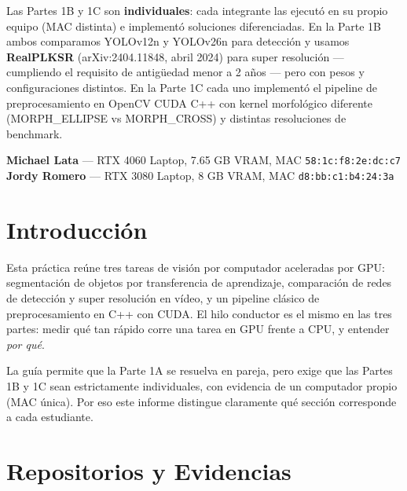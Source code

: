 \documentclass[12pt,a4paper]{article}
\begin{document}
Las Partes 1B y 1C son \textbf{individuales}: cada integrante las ejecutó en su propio equipo (MAC distinta) e implementó soluciones diferenciadas. En la Parte 1B ambos comparamos YOLOv12n y YOLOv26n para detección y usamos \textbf{RealPLKSR} (arXiv:2404.11848, abril 2024) para super resolución — cumpliendo el requisito de antigüedad menor a 2 años — pero con pesos y configuraciones distintos. En la Parte 1C cada uno implementó el pipeline de preprocesamiento en OpenCV CUDA C++ con kernel morfológico diferente (MORPH\_ELLIPSE vs MORPH\_CROSS) y distintas resoluciones de benchmark.

\vspace{0.4em}
\noindent\colorbox{michaelbg}{\textbf{Michael Lata} — RTX 4060 Laptop, 7.65 GB VRAM, MAC \texttt{58:1c:f8:2e:dc:c7}}\\
\colorbox{jordybg}{\textbf{Jordy Romero} — RTX 3080 Laptop, 8 GB VRAM, MAC \texttt{d8:bb:c1:b4:24:3a}}

\clearpage
\tableofcontents
\clearpage

\section{Introducción}

Esta práctica reúne tres tareas de visión por computador aceleradas por GPU: segmentación de objetos por transferencia de aprendizaje, comparación de redes de detección y super resolución en vídeo, y un pipeline clásico de preprocesamiento en C++ con CUDA. El hilo conductor es el mismo en las tres partes: medir qué tan rápido corre una tarea en GPU frente a CPU, y entender \emph{por qué}.

La guía permite que la Parte 1A se resuelva en pareja, pero exige que las Partes 1B y 1C sean estrictamente individuales, con evidencia de un computador propio (MAC única). Por eso este informe distingue claramente qué sección corresponde a cada estudiante.

\section*{Repositorios y Evidencias}
\end{document}
